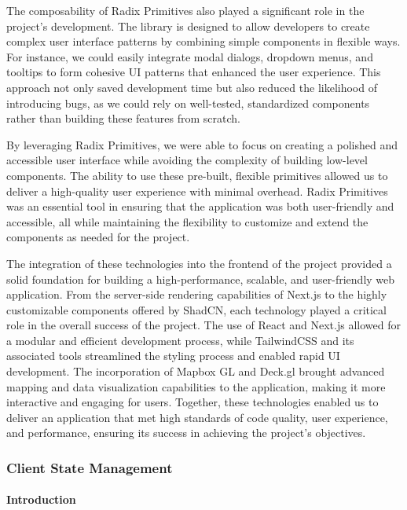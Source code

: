 The composability of Radix Primitives also played a significant role in the
project's development. The library is designed to allow developers to create
complex user interface patterns by combining simple components in flexible
ways. For instance, we could easily integrate modal dialogs, dropdown menus,
and tooltips to form cohesive UI patterns that enhanced the user experience.
This approach not only saved development time but also reduced the
likelihood of introducing bugs, as we could rely on well{-}tested,
standardized components rather than building these features from scratch.

By leveraging Radix Primitives, we were able to focus on creating a polished
and accessible user interface while avoiding the complexity of building
low{-}level components. The ability to use these pre{-}built, flexible
primitives allowed us to deliver a high{-}quality user experience with
minimal overhead. Radix Primitives was an essential tool in ensuring that
the application was both user{-}friendly and accessible, all while
maintaining the flexibility to customize and extend the components as needed
for the project.


The integration of these technologies into the frontend of the project provided
a solid foundation for building a high{-}performance, scalable, and
user{-}friendly web application. From the server{-}side rendering capabilities
of Next.js to the highly customizable components offered by ShadCN, each
technology played a critical role in the overall success of the project. The use
of React and Next.js allowed for a modular and efficient development process,
while TailwindCSS and its associated tools streamlined the styling process and
enabled rapid UI development. The incorporation of Mapbox GL and Deck.gl brought
advanced mapping and data visualization capabilities to the application, making
it more interactive and engaging for users. Together, these technologies enabled
us to deliver an application that met high standards of code quality, user
experience, and performance, ensuring its success in achieving the project's
objectives.

\subsubsection{Client State Management}
\paragraph{Introduction}\mbox{}

